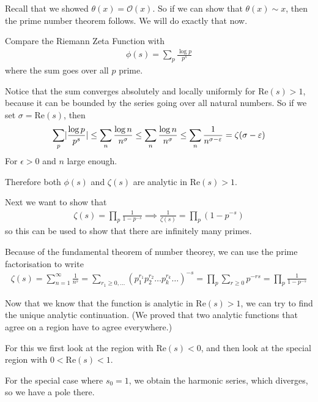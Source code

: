 Recall that we showed $\theta(x) = \mathcal{O}(x)$. So if we can show that $\theta(x) \sim x$, then the prime number theorem follows. We will do exactly that now.

Compare the Riemann Zeta Function with 
\begin{align*}
	\phi(s) = \sum_{p} \frac{\log p}{p^s}
\end{align*}
where the sum goes over all $p$ prime.

Notice that the sum converges absolutely and locally uniformly for $\text{Re}(s) > 1$, because it can be bounded by the series going over all natural numbers.
So if we set $\sigma = \text{Re}(s)$, then
\begin{align*}
	\sum_{p} \abs{\frac{\log p}{p^{s}}} \leq \sum_{n}\frac{\log n}{n^{\sigma}} \leq \sum_{n}\frac{\log n}{n^{\sigma}} \leq \sum_{n}\frac{1}{n^{\sigma - \epsilon}} = \zeta(\sigma - \epsilon)
\end{align*}
For $\epsilon > 0$ and $n$ large enough.

Therefore both $\phi(s)$ and $\zeta(s)$ are analytic in $\text{Re}(s) > 1$. 

Next we want to show that
\begin{align*}
	\zeta(s) = \prod_{p}\frac{1}{1 - p^{-s}} \implies \frac{1}{\zeta(s)} = \prod_{p}(1 - p^{-s})
\end{align*}
so this can be used to show that there are infinitely many primes.


Because of the fundamental theorem of number theorey, we can use the prime factorisation to write
\begin{align*}
	\zeta(s) = \sum_{n=1}^{\infty}\frac{1}{n^{s}} = \sum_{r_1 \geq 0, \ldots} (p_1^{r_1}p_2^{r_2} \dots p_k^{r_k} \dots)^{-s} = \prod_{p} \sum_{r \geq 0}p^{-rs} = \prod_{p} \frac{1}{1- p^{-s}}
\end{align*}

Now that we know that the function is analytic in $\text{Re}(s) > 1$, we can try to find the unique analytic continuation. (We proved that two analytic functions that agree on a region have to agree everywhere.)

For this we first look at the region with $\text{Re}(s) < 0$, and then look at the special region with $0 < \text{Re}(s) < 1$.

For the special case where $s_0 = 1$, we obtain the harmonic series, which diverges, so we have a pole there.

